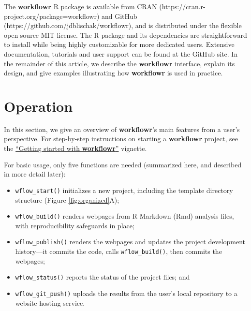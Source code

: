 \documentclass[9pt,a4paper]{extarticle}
\begin{document}
The \textbf{workflowr} R package is available from CRAN
(https://cran.r-project.org/package=workflowr) and GitHub
(https://github.com/jdblischak/workflowr), and is distributed under the
flexible open source MIT license. The R package and its dependencies are
straightforward to install while being highly customizable for more
dedicated users. Extensive documentation, tutorials and user support can
be found at the GitHub site. In the remainder of this article, we
describe the \textbf{workflowr} interface, explain its design, and give examples
illustrating how \textbf{workflowr} is used in practice.


\section*{Operation}

In this section, we give an overview of \textbf{workflowr}'s main features from a
user's perspective. For step-by-step instructions on starting a
 \textbf{workflowr} project, see the
\href{https://jdblischak.github.io/workflowr/articles/wflow-01-getting-started.html}{``Getting
started with \textbf{workflowr}''} vignette.

For basic usage, only five functions are needed (summarized here, and
described in more detail later):

\begin{itemize}

\item \texttt{wflow\_start()} initializes a new project, including the template
directory structure (Figure \ref{fig:organized}A);

\item \texttt{wflow\_build()} renders webpages from R Markdown (Rmd) analysis
files, with reproducibility safeguards in place;

\item \texttt{wflow\_publish()} renders the webpages and updates the project
development history—it commits the code, calls \texttt{wflow\_build()}, then
commits the webpages;

\item \texttt{wflow\_status()} reports the status of the project files; and

\item \texttt{wflow\_git\_push()} uploads the results from the user's local
repository to a website hosting service.

\end{itemize}
\end{document}
